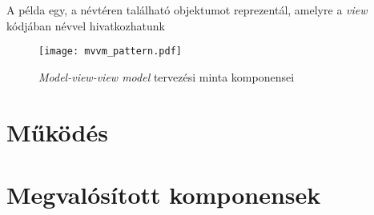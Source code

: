 A példa egy, a  névtéren található  objektumot reprezentál, amelyre a \emph{view} kódjában  névvel hivatkozhatunk

\begin{figure}[h]
\vspace{.5cm}
\texttt{[image: mvvm\_pattern.pdf]}
\centering
\vspace{.2cm}
\caption{\emph{Model-view-view model} tervezési minta komponensei}
\vspace{.5cm}
\label{fig:mvvm_pattern}
\end{figure}

\section{Működés}

\section{Megvalósított komponensek}
